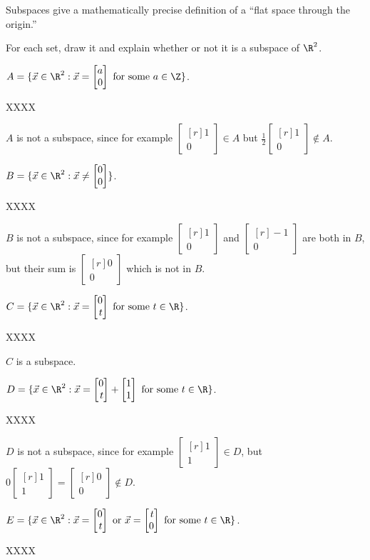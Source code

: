 \documentclass{problemset}
\newcommand{\mat}[1]{\begin{bmatrix*}[r]#1\end{bmatrix*}}
\begin{document}
	Subspaces give a mathematically precise definition of a ``flat space through the origin.''

	\question
	For each set, draw it and explain whether or not it is a subspace of $\R^2$.
	\begin{parts}
		\item $A=\{\vec x\in\R^2:\vec x=\mat{a\\0}\text{ for some }a\in\Z\}$.
			\begin{solution}
				XXXX

				$A$ is not a subspace, since for example $\mat{1\\0} \in A$ but 
				$\frac{1}{2}\mat{1\\0}\notin A$. 
			\end{solution}
		\item $B=\{\vec x\in\R^2:\vec x\neq \mat{0\\0}\}$.
			\begin{solution}
				XXXX
					
				$B$ is not a subspace, since for example $\mat{1\\0}$ and $\mat{-1\\0}$
				are both in $B$, but their sum is $\mat{0\\0}$ which is not in $B$.
			\end{solution}
		\item $C=\{\vec x\in\R^2:\vec x=\mat{0\\t}\text{ for some }t\in\R\}$.
			\begin{solution}
				XXXX
					
				$C$ is a subspace. 
			\end{solution}
		\item $D=\{\vec x\in\R^2:\vec x=\mat{0\\t}+\mat{1\\1}\text{ for some }t\in\R\}$.
			\begin{solution}
				XXXX
					
				$D$ is not a subspace, since for example $\mat{1\\1}\in D$, but
				$0\mat{1\\1}=\mat{0\\0}\notin D$. 
			\end{solution}
		\item $E=\{\vec x\in\R^2:\vec x=\mat{0\\t}\text{ or }\vec x=\mat{t\\0}\text{ for some }t\in\R\}$.
			\begin{solution}
				XXXX


\end{solution}
\end{parts}
\end{document}
